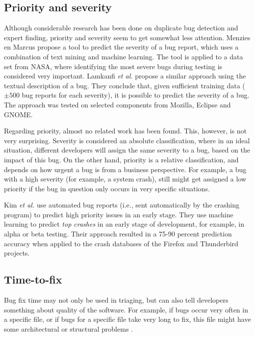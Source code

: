 \subsection{Priority and severity}
Although considerable research has been done on duplicate bug detection and expert finding, priority and severity seem to get somewhat less attention. Menzies en Marcus \cite{Menzies2008} propose a tool to predict the severity of a bug report, which uses a combination of text mining and machine learning. The tool is applied to a data set from NASA, where identifying the most severe bugs during testing is considered very important. Lamkanfi \emph{et al.} \cite{Lamkanfi2010} propose a similar approach using the textual description of a bug. They conclude that, given sufficient training data ($\pm 500$ bug reports for each severity), it is possible to predict the severity of a bug. The approach was tested on selected components from Mozilla, Eclipse and GNOME. 

Regarding priority, almost no related work has been found. This, however, is not very surprising. Severity is considered an absolute classification, where in an ideal situation, different developers will assign the same severity to a bug, based on the impact of this bug. On the other hand, priority is a relative classification, and depends on how urgent a bug is from a business perspective. For example, a bug with a high severity (for example, a system crash), still might get assigned a low priority if the bug in question only occurs in very specific situations.

Kim \emph{et al.} \cite{Kim2011} use automated bug reports (i.e., sent automatically by the crashing program) to predict high priority issues in an early stage. They use machine learning to predict \emph{top crashes} in an early stage of development, for example, in alpha or beta testing. Their approach resulted in a 75-90 percent prediction accuracy when applied to the crash databases of the Firefox and Thunderbird projects.

\subsection{Time-to-fix}
Bug fix time may not only be used in triaging, but can also tell developers something about quality of the software. For example, if bugs occur very often in a specific file, or if bugs for a specific file take very long to fix, this file might have some architectural or structural problems \cite{Kim2006}.

